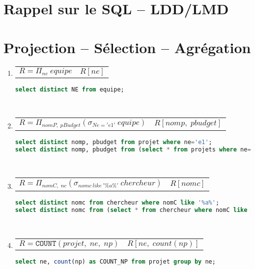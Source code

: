 \documentclass[12pt,a4paper,openany]{book}
\newcommand{\acount}{\texttt{COUNT}}
\begin{document}
	\setcounter{tocdepth}{2}
	\setcounter{secnumdepth}{3}
	\maketitle
	\tableofcontents
	\chapter{Rappel sur le SQL -- LDD/LMD }
	
	
	
	
	\chapter{Projection -- Sélection -- Agrégation}
	\begin{enumerate}
		\item 
			\begin{tabular}{p{8cm}p{4cm}}
			$R = \Pi_{ne}\ equipe$ & $R[ne]$
			\end{tabular}
	\begin{lstlisting}[language=SQL, numbers=none]
select distinct NE from equipe; 
	\end{lstlisting}
	 ~
\item 
			\begin{tabular}{p{8cm}p{4cm}}
		$R=\Pi_{nomP,\; pBudget}(\sigma_{Ne='e1'}\ equipe)$ & $R[nomp,\; pbudget]$
			\end{tabular}
	\begin{lstlisting}[language=SQL, numbers=none]
select distinct nomp, pbudget from projet where ne='e1'; 
select distinct nomp, pbudget from (select * from projets where ne='e1'); 
	\end{lstlisting}
	 ~
\item 
			\begin{tabular}{p{8cm}p{4cm}}
	$R = \Pi_{nomC,\; nc} (\sigma_{nomc\ {like}\ '\%a\%'}\ chercheur)$ & $R[nomc]$
			\end{tabular}
	\begin{lstlisting}[language=SQL, numbers=none]
select distinct nomc from chercheur where nomC like '%a%';
select distinct nomc from (select * from chercheur where nomC like '%a%'); 
	\end{lstlisting}
	 ~
\item 
			\begin{tabular}{p{8cm}p{4cm}}
	$R = \acount(projet,\; ne,\; np)$ & $R[ne,\; count(np)]$ 
			\end{tabular}
	\begin{lstlisting}[language=SQL, numbers=none]
select ne, count(np) as COUNT_NP from projet group by ne;
	\end{lstlisting}
	 ~


\end{enumerate}
\end{document}
